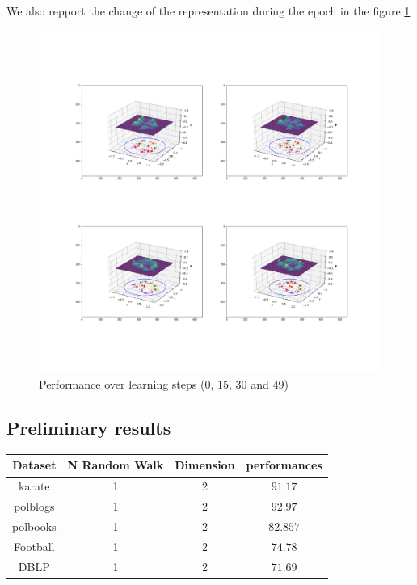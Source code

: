 \documentclass{article}
\begin{document}
    We also repport the change of the representation during the epoch in the figure \ref{rep_ev_football}
    \begin{figure}[h]
        \centering
        \includegraphics[scale=0.4]{media/football_representation.png}

        \caption{Performance over learning steps (0, 15, 30 and 49)}
        \label{rep_ev_football}
    \end{figure}
    \subsection{Preliminary results}
     \begin{table}
        \begin{tabular}{|c|c|c|c|}
            \hline
            Dataset & N Random Walk& Dimension & performances \\
            \hline
            karate & 1 & 2 & $91.17$ \\

            polblogs & 1 & 2 & $92.97$ \\

            polbooks & 1 & 2 & $82.857$ \\

            Football & 1 & 2 & $74.78$ \\

            DBLP & 1 & 2 & $71.69$\\

            \hline
        \end{tabular}
     \end{table}
\end{document}
